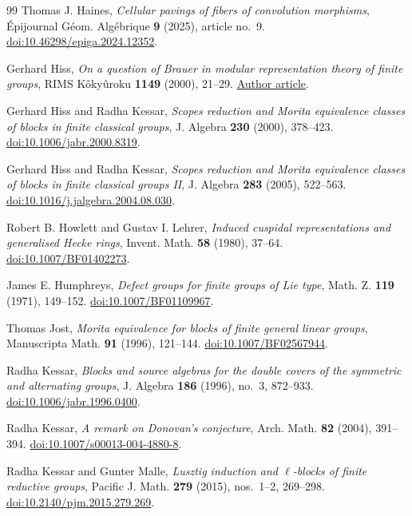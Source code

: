 \begin{thebibliography}{99}
Thomas J. Haines,
\emph{Cellular pavings of fibers of convolution morphisms},
\'Epijournal G\'eom. Alg\'ebrique \textbf{9} (2025), article no.~9.
\href{https://doi.org/10.46298/epiga.2024.12352}{doi:10.46298/epiga.2024.12352}.

Gerhard Hiss,
\emph{On a question of Brauer in modular representation theory of finite groups},
RIMS K\^oky\^uroku \textbf{1149} (2000), 21--29.
\href{https://www.kurims.kyoto-u.ac.jp/~kyodo/kokyuroku/contents/pdf/1149-3.pdf}{Author article}.

Gerhard Hiss and Radha Kessar,
\emph{Scopes reduction and Morita equivalence classes of blocks in
finite classical groups},
J. Algebra \textbf{230} (2000), 378--423.
\href{https://doi.org/10.1006/jabr.2000.8319}{doi:10.1006/jabr.2000.8319}.

Gerhard Hiss and Radha Kessar,
\emph{Scopes reduction and Morita equivalence classes of blocks in
finite classical groups II},
J. Algebra \textbf{283} (2005), 522--563.
\href{https://doi.org/10.1016/j.jalgebra.2004.08.030}{doi:10.1016/j.jalgebra.2004.08.030}.

Robert B. Howlett and Gustav I. Lehrer,
\emph{Induced cuspidal representations and generalised Hecke rings},
Invent. Math. \textbf{58} (1980), 37--64.
\href{https://doi.org/10.1007/BF01402273}{doi:10.1007/BF01402273}.

James E. Humphreys,
\emph{Defect groups for finite groups of Lie type},
Math. Z. \textbf{119} (1971), 149--152.
\href{https://doi.org/10.1007/BF01109967}{doi:10.1007/BF01109967}.

Thomas Jost,
\emph{Morita equivalence for blocks of finite general linear groups},
Manuscripta Math. \textbf{91} (1996), 121--144.
\href{https://doi.org/10.1007/BF02567944}{doi:10.1007/BF02567944}.

Radha Kessar,
\emph{Blocks and source algebras for the double covers of the symmetric
and alternating groups},
J. Algebra \textbf{186} (1996), no.~3, 872--933.
\href{https://doi.org/10.1006/jabr.1996.0400}{doi:10.1006/jabr.1996.0400}.

Radha Kessar,
\emph{A remark on Donovan's conjecture},
Arch. Math. \textbf{82} (2004), 391--394.
\href{https://doi.org/10.1007/s00013-004-4880-8}{doi:10.1007/s00013-004-4880-8}.

Radha Kessar and Gunter Malle,
\emph{Lusztig induction and \(\ell\)-blocks of finite reductive groups},
Pacific J. Math. \textbf{279} (2015), nos.~1--2, 269--298.
\href{https://doi.org/10.2140/pjm.2015.279.269}{doi:10.2140/pjm.2015.279.269}.


\end{thebibliography}
